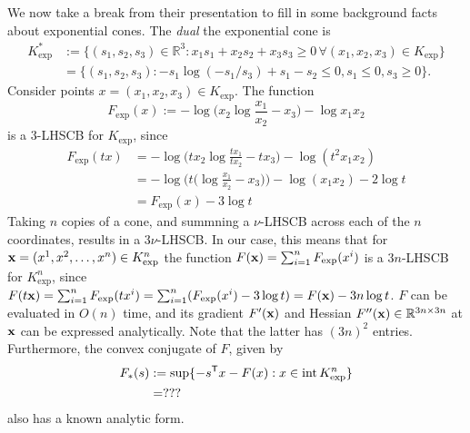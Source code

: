 \documentclass[twoside]{article}
\begin{document}
\begin{lproof}
    We now take a break from their presentation to fill in some background facts about exponential cones.
    The \emph{dual} the exponential cone is
    \begin{align*}
        K_{\exp}^* &:= \{ (s_1, s_2, s_3) \in \mathbb R^3 : 
            x_1 s_1 + x_2 s_2 + x_3 s_3 \ge 0 \, \forall (x_1, x_2, x_3) \in K_{\exp} \}\\
            &= \{
                (s_1, s_2, s_3) : - s_1 \log (- s_1 / s_3) + s_1 - s_2 \le 0, s_1 \le 0, s_3 \ge 0
            \}.
    \end{align*}
    Consider points $x = (x_1, x_2, x_3) \in K_{\exp}$. 
    The function 
    \begin{equation}
        F_{\exp}(x) := - \log \Big(x_2 \log\frac{x_1}{x_2} - x_3\Big) - \log x_1 x_2
    \end{equation}
    is a $3$-LHSCB for $K_{\exp}$, since
    \begin{align*}
        F_{\exp}(t x) &= 
            -\log \Big( t x_2 \log \frac{t x_1}{t x_2} - t x_3\Big) - \log(t^2 x_1 x_2) \\
        &= - \log \Big(t \big(\log \frac{x_1}{x_2} - x_3\big)\Big) - \log(x_1 x_2) - 2 \log t \\
        &= F_{\exp}(x) - 3 \log t
    \end{align*}
    Taking $n$ copies of a cone, and summning a $\nu$-LHSCB across each of the $n$ coordinates, results in a $3\nu$-LHSCB. In our case, this means that for $\mathbf{x} = (x^1, x^2, \ldots, x^n) \in K_{\exp}^n$ the function 
    $ F(\mathbf{x}) = \sum_{i=1}^n F_{\exp}(x^i) $
    is a $3n$-LHSCB for $K_{\exp}^n$, since
    $F(t \mathbf{x}) 
    = \sum_{i=1}^n F_{\exp}(t x^i)
    = \sum_{i=1}^n (F_{\exp}(x^i) - 3 \log t)
    = F(\mathbf{x}) - 3n \log t$. 
    $F$ can be evaluated in $O(n)$ time, and
    its gradient $F'(\mathbf{x})$ and Hessian $F''(\mathbf{x}) \in \mathbb R^{3n \times 3n}$ at $\mathbf{x}$ can be expressed analytically.
    Note that the latter has $(3n)^2$ entries. 
    Furthermore, the convex conjugate of $F$, given by 
    \begin{align*}
        F_*(s) &:=  
        \sup\{ - s^{\sf T} x- F(x) : x \in \mathrm{int}\, K_{\exp}^n \}
            \\
        &= ???
    \end{align*}
    also has a known analytic form.
    

\end{lproof}
\end{document}
